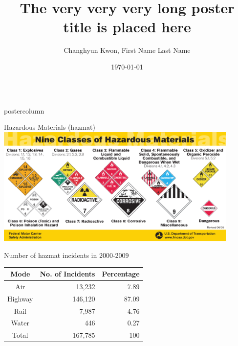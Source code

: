 \documentclass[final]{beamer}
\title{The very very very long poster title is placed here}
\author{Changhyun Kwon, First Name Last Name}
\institute{University of South Florida}
\date{\today}
\newlength{\columnheight}
\begin{document}
\begin{frame}
\begin{columns}








\begin{column}{0.32\textwidth}
\begin{beamercolorbox}[center,wd=\textwidth]{postercolumn}
\begin{minipage}[T]{.95\textwidth}
\parbox[t][\columnheight]{\textwidth}{


	\begin{block}{Hazardous Materials (hazmat)}
  	\includegraphics[width=0.9\textwidth]{yellowcard2}
	\end{block}

  \begin{block}{Number of hazmat incidents in 2000-2009 }
    \begin{table} \centering \small
    \begin{tabular}{|c|r|r|}
    \hline Mode & No. of Incidents & Percentage \\ 
    \hline Air & 13,232 & 7.89 \\ 
    \hline Highway & 146,120 & 87.09 \\ 
    \hline Rail & 7,987 & 4.76 \\ 
    \hline Water & 446 & 0.27 \\ 
    \hline Total & 167,785 & 100 \\ 
    \hline 
    \end{tabular} 
    \end{table}
  \end{block}

}
\end{minipage}
\end{beamercolorbox}
\end{column}
\end{columns}
\end{frame}
\end{document}
